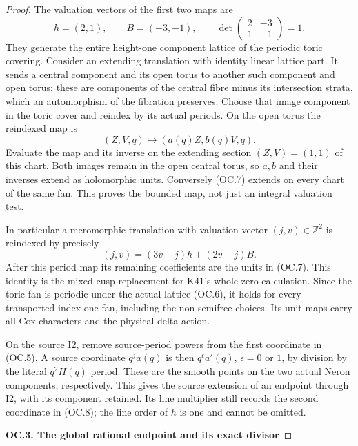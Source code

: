\begin{proof}
The valuation vectors of the first two maps are
\[
                   h=(2,1),\qquad B=(-3,-1),\qquad
             \det\begin{pmatrix}2&-3\\1&-1\end{pmatrix}=1.
                                                               \tag{OC.6}
\]
They generate the entire height-one component lattice of the
periodic toric covering. Consider an extending translation with
identity linear lattice part. It sends a central component and its
open torus to another such component and open torus: these are
components of the central fibre minus its intersection strata, which
an automorphism of the fibration preserves. Choose that image
component in the toric cover and reindex by its actual periods. On
the open torus the reindexed map is
\[
                    (Z,V,q)\longmapsto(a(q)Z,b(q)V,q).     \tag{OC.7}
\]
Evaluate the map and its inverse on the extending section
\((Z,V)=(1,1)\) of this chart. Both images remain in the open
central torus, so \(a,b\) and their inverses extend as
holomorphic units. Conversely (OC.7) extends on every chart of
the same fan. This proves the bounded map, not just an integral
valuation test.

In particular a meromorphic translation with valuation vector
\((j,v)\in\mathbb Z^2\) is reindexed by precisely
\[
       (j,v)=(3v-j)h+(2v-j)B.                             \tag{OC.8}
\]
After this period map its remaining coefficients are the units in
(OC.7). This identity is the mixed-cusp replacement for K41's
whole-zero calculation. Since the toric fan is periodic under the
actual lattice (OC.6), it holds for every transported index-one fan,
including the non-semifree choices. Its unit maps carry all Cox
characters and the physical delta action.

On the source I2, remove source-period powers from the first
coordinate in (OC.5). A source coordinate \(q^j a(q)\) is
then \(q^\epsilon a'(q)\), \(\epsilon=0\) or \(1\),
by division by the literal \(q^2H(q)\) period. These are the
smooth points on the two actual Neron components, respectively.
This gives the source extension of an endpoint through I2, with
its component retained. Its line multiplier still records the
second coordinate in (OC.8); the line order of \(h\) is one
and cannot be omitted.

\par

\medskip\noindent\textbf{OC.3. The global rational endpoint and its exact divisor}


\end{proof}
